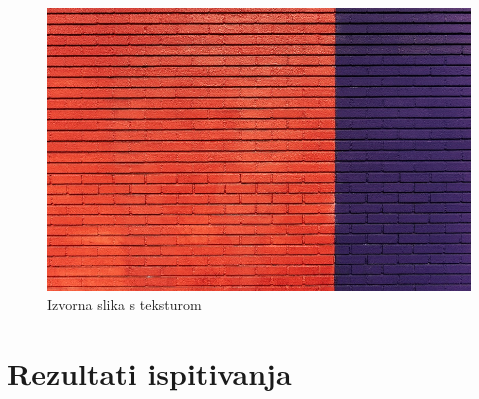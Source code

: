 \documentclass[times, utf8, seminar]{fer}
\begin{document}
\begin{center}

\begin{figure}[ht]
	\caption{Izvorna slika s teksturom}
	\label{pattern_original}
	\centerline{
	\includegraphics[scale=0.4]{../benchmark_results/pattern/pattern_original.jpg}	
	}
\end{figure}
\end{center}

\section{Rezultati ispitivanja}
\end{document}
